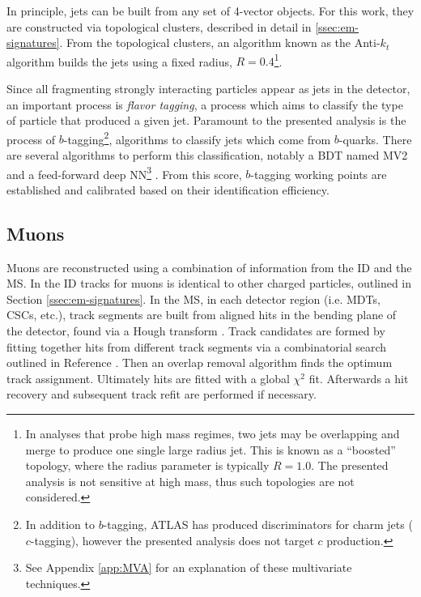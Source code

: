In principle, jets can be built from any set of 4-vector objects. For this work, they are constructed via topological clusters, described in detail in \ref{ssec:em-signatures}. From the topological clusters, an algorithm known as the Anti-$k_t$ algorithm \cite{anti-kt} builds the jets using a fixed radius, $R=0.4$\footnote{In analyses that probe high mass regimes, two jets may be overlapping and merge to produce one single large radius jet. This is known as a ``boosted'' topology, where the radius parameter is typically $R=1.0$. The presented analysis is not sensitive at high mass, thus such topologies are not considered.}.


Since all fragmenting strongly interacting particles appear as jets in the detector, an important process is \textit{flavor tagging}, a process which aims to classify the type of particle that produced a given jet. Paramount to the presented analysis is the process of $b$-tagging\footnote{In addition to $b$-tagging, ATLAS has produced discriminators for charm jets ($c$-tagging), however the presented analysis does not target $c$ production.}, algorithms to classify jets which come from $b$-quarks. There are several algorithms to perform this classification, notably a \gls{BDT} named MV2 \cite{mv2-dl1} and a feed-forward deep \gls{NN}\footnote{See Appendix \ref{app:MVA} for an explanation of these multivariate techniques.} \cite{mv2-dl1}. From this score, $b$-tagging working points are established and calibrated based on their identification efficiency. 


\subsection{Muons}

Muons are reconstructed using a combination of information from the \gls{ID} and the \gls{MS}. In the \gls{ID} tracks for muons is identical to other charged particles, outlined in Section \ref{ssec:em-signatures}. In the \gls{MS}, in each detector region (i.e. \glspl{MDT}, \glspl{CSC}, etc.), track segments are built from aligned hits in the bending plane of the detector, found via a Hough transform \cite{hough-transf}. Track candidates are formed by fitting together hits from different track segments via a combinatorial search outlined in Reference \cite{muon-reco}. Then an overlap removal algorithm finds the optimum track assignment. Ultimately hits are fitted with a global $\chi^2$ fit. Afterwards a hit recovery and subsequent track refit are performed if necessary.

